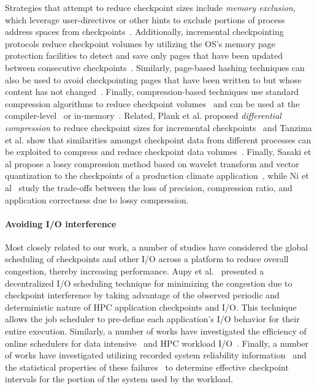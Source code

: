\documentclass[two]{article}
\begin{document}
Strategies that attempt to reduce checkpoint sizes include \emph{memory
exclusion}, which leverage user-directives or other hints to exclude portions of
process address spaces from checkpoints~\cite{Plank99MemoryExclusion}.
Additionally, incremental checkpointing protocols reduce checkpoint volumes by
utilizing the OS's memory page protection facilities to detect and save only
pages that have been updated between consecutive
checkpoints~\cite{Bronevetsky09Compiler,
Chen97CLIP,Elnozahy92ConsistentCheckpointing,Li94ConcurrentCheckpointing,
Plank94Libckpt,Paun10IncrementalWeibull,Kiswany08stdchk}.  Similarly,
page-based hashing techniques can also be used to avoid checkpointing pages
that have been written to but whose content has not
changed~\cite{Ferreira11Libhashckpt}.  Finally, compression-based techniques
use standard compression algorithms to reduce checkpoint
volumes~\cite{Ibtesham12Compression} and can be used at the
compiler-level~\cite{Li90CATCH} or in-memory~\cite{Plank94ICKP}.  Related,
Plank et al. proposed \textit{differential compression} to reduce checkpoint
sizes for incremental checkpoints~\cite{Plank95CompressedDiff} and Tanzima et
al.  show that similarities amongst checkpoint data from different processes
can be exploited to compress and reduce checkpoint data
volumes~\cite{tanzima12mcrengine}.  Finally, Sasaki et al propose a lossy
compression method based on wavelet transform and vector quantization to the
checkpoints of a production climate application~\cite{sasaki2015}, while Ni et
al~\cite{Ni2014} study the trade-offs between the loss of precision, compression
ratio, and application correctness due to lossy compression.

\paragraph*{Avoiding I/O interference}

Most closely related to our work, a number of studies have considered the global
scheduling of checkpoints and other I/O across a platform to reduce overall
congestion, thereby increasing performance.  Aupy et al.~\cite{Aupy:2017:Periodic}
presented a decentralized I/O scheduling technique for minimizing the congestion due
to checkpoint interference by taking advantage of the observed periodic and
deterministic nature of HPC application checkpoints and I/O.  This technique allows
the job scheduler to pre-define each application’s I/O behavior for their entire
execution.  Similarly, a number of works have investigated the efficiency of online
schedulers for data intensive~\cite{Groot2013,Sim:2015:AnalyzeThis} and HPC workload
I/O~\cite{Dorier2015,Gainaru:2016:Scheduling,Zhou:2015:IOAware,Herbein2017}.
Finally, a number of works have investigated utilizing recorded system reliability
information~\cite{Oliner:2006:Cooperative} and the statistical properties of these
failures~\cite{Tiwari:2014:Lazy} to determine effective checkpoint intervals for the
portion of the system used by the workload.
\end{document}
